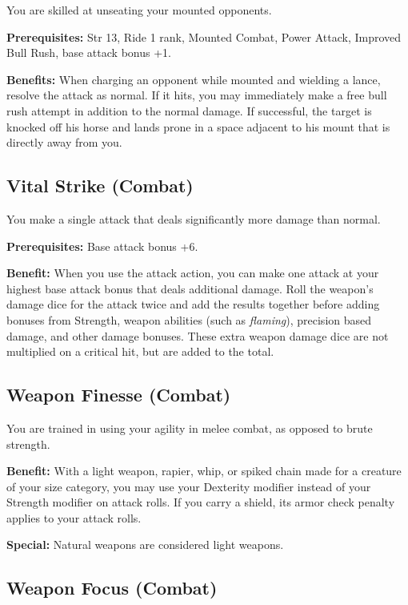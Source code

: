 				
You are skilled at unseating your mounted opponents.
				
\textbf{Prerequisites:} Str 13, Ride 1 rank, Mounted Combat, Power Attack, Improved Bull Rush, base attack bonus +1.
				
\textbf{Benefits:} When charging an opponent while mounted and wielding a lance, resolve the attack as normal. If it hits, you may immediately make a free bull rush attempt in addition to the normal damage. If successful, the target is knocked off his horse and lands prone in a space adjacent to his mount that is directly away from you.
				
\subsection{Vital Strike (Combat)}

				
You make a single attack that deals significantly more damage than normal.
				
\textbf{Prerequisites:} Base attack bonus +6.
				
\textbf{Benefit:} When you use the attack action, you can make one attack at your highest base attack bonus that deals additional damage. Roll the weapon's damage dice for the attack twice and add the results together before adding bonuses from Strength, weapon abilities (such as \textit{flaming}), precision based damage, and other damage bonuses. These extra weapon damage dice are not multiplied on a critical hit, but are added to the total.
				
\subsection{Weapon Finesse (Combat)}

				
You are trained in using your agility in melee combat, as opposed to brute strength.
				
\textbf{Benefit:} With a light weapon, rapier, whip, or spiked chain made for a creature of your size category, you may use your Dexterity modifier instead of your Strength modifier on attack rolls. If you carry a shield, its armor check penalty applies to your attack rolls.
				
\textbf{Special:} Natural weapons are considered light weapons.
				
\subsection{Weapon Focus (Combat)}

